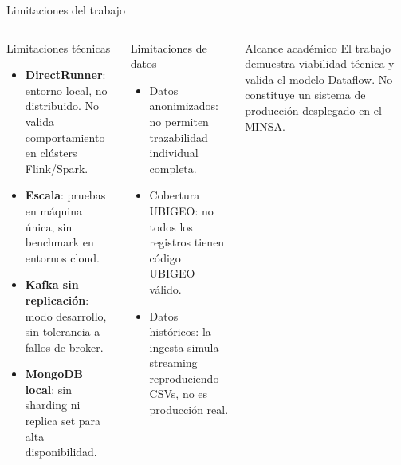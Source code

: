 \documentclass[aspectratio=169, 10pt]{beamer}
\begin{document}
\begin{frame}{Limitaciones del trabajo}
  \begin{columns}[t]
      \begin{alertblock}{Limitaciones t\'ecnicas}
        \begin{itemize}\setlength\itemsep{3pt}
          \item \textbf{DirectRunner}: entorno local, no distribuido.
                No valida comportamiento en cl\'usters Flink/Spark.
          \item \textbf{Escala}: pruebas en m\'aquina \'unica,
                sin benchmark en entornos cloud.
          \item \textbf{Kafka sin replicaci\'on}: modo desarrollo,
                sin tolerancia a fallos de broker.
          \item \textbf{MongoDB local}: sin sharding ni replica set
                para alta disponibilidad.
        \end{itemize}
      \end{alertblock}
      \begin{alertblock}{Limitaciones de datos}
        \begin{itemize}\setlength\itemsep{3pt}
          \item Datos anonimizados: no permiten trazabilidad
                individual completa.
          \item Cobertura UBIGEO: no todos los registros tienen
                c\'odigo UBIGEO v\'alido.
          \item Datos hist\'oricos: la ingesta simula streaming
                reproduciendo CSVs, no es producci\'on real.
        \end{itemize}
      \end{alertblock}
      \vspace{6pt}
      \begin{block}{Alcance acad\'emico}
        \small
        El trabajo demuestra viabilidad t\'ecnica y valida
        el modelo Dataflow. No constituye un sistema de
        producci\'on desplegado en el MINSA.
      \end{block}
  \end{columns}
\end{frame}
\end{document}
